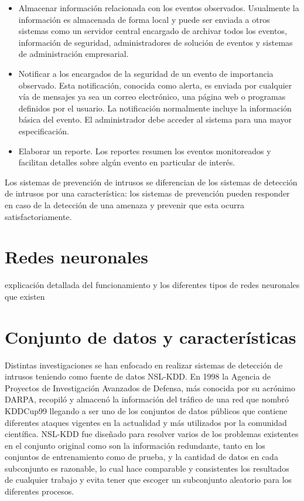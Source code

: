 \begin{itemize}
    \item Almacenar información relacionada con los eventos observados. Usualmente la información es almacenada de forma local y puede ser enviada a otros sistemas como un servidor central encargado de archivar todos los eventos, información de seguridad, administradores de solución de eventos y sistemas de administración empresarial.
    \item Notificar a los encargados de la seguridad de un evento de importancia observado. Esta notificación, conocida como alerta, es enviada por cualquier vía de mensajes ya sea un correo electrónico, una página web o programas definidos por el usuario. La notificación normalmente incluye la información básica del evento. El administrador debe acceder al sistema para una mayor especificación.
    \item Elaborar un reporte. Los reportes resumen los eventos monitoreados y facilitan detalles sobre algún evento en particular de interés.
\end{itemize}

Los sistemas de prevención de intrusos se diferencian de los sistemas de detección de intrusos por una característica: los sistemas de prevención pueden responder en caso de la detección de una amenaza y prevenir que esta ocurra satisfactoriamente.

\section{Redes neuronales}
explicación detallada del funcionamiento y los diferentes tipos de redes neuronales que existen

\section{Conjunto de datos y características}
Distintas investigaciones se han enfocado en realizar sistemas de detección de intrusos teniendo como fuente de datos NSL-KDD. En 1998 la Agencia de Proyectos de Investigación Avanzados de Defensa, más conocida por su acrónimo DARPA, recopiló y almacenó la información del tráfico de una red que nombró KDDCup99 llegando a ser uno de los conjuntos de datos públicos que contiene diferentes ataques vigentes en la actualidad y más utilizados por la comunidad científica. NSL-KDD fue diseñado para resolver varios de los problemas existentes en el conjunto original como son la información redundante, tanto en los conjuntos de entrenamiento como de prueba, y la cantidad de datos en cada subconjunto es razonable, lo cual hace comparable y consistentes los resultados de cualquier trabajo y evita tener que escoger un subconjunto aleatorio para los diferentes procesos.

